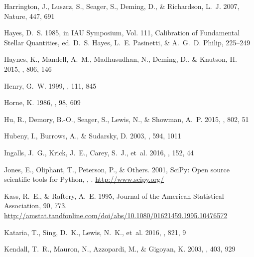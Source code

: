 \documentclass[twocolumn, trackchanges]{aastex61}
\begin{document}
\begin{thebibliography}{}
{Harrington}, J., {Luszcz}, S., {Seager}, S., {Deming}, D., \& {Richardson},
  L.~J. 2007, Nature, 447, 691

{Hayes}, D.~S. 1985, in IAU Symposium, Vol. 111, Calibration of Fundamental
  Stellar Quantities, ed. D.~S. {Hayes}, L.~E. {Pasinetti}, \& A.~G.~D.
  {Philip}, 225--249

{Haynes}, K., {Mandell}, A.~M., {Madhusudhan}, N., {Deming}, D., \& {Knutson},
  H. 2015, \apj, 806, 146

{Henry}, G.~W. 1999, \pasp, 111, 845

{Horne}, K. 1986, \pasp, 98, 609

{Hu}, R., {Demory}, B.-O., {Seager}, S., {Lewis}, N., \& {Showman}, A.~P. 2015,
  \apj, 802, 51

{Hubeny}, I., {Burrows}, A., \& {Sudarsky}, D. 2003, \apj, 594, 1011

{Ingalls}, J.~G., {Krick}, J.~E., {Carey}, S.~J., {et~al.} 2016, \aj, 152, 44

Jones, E., Oliphant, T., Peterson, P., \& Others. 2001, {SciPy}: Open source
  scientific tools for Python, , .
\newblock \url{http://www.scipy.org/}

Kass, R.~E., \& Raftery, A.~E. 1995, Journal of the American Statistical
  Association, 90, 773.
\newblock
  \url{http://amstat.tandfonline.com/doi/abs/10.1080/01621459.1995.10476572}

{Kataria}, T., {Sing}, D.~K., {Lewis}, N.~K., {et~al.} 2016, \apj, 821, 9

{Kendall}, T.~R., {Mauron}, N., {Azzopardi}, M., \& {Gigoyan}, K. 2003, \aap,
  403, 929


\end{thebibliography}
\end{document}
